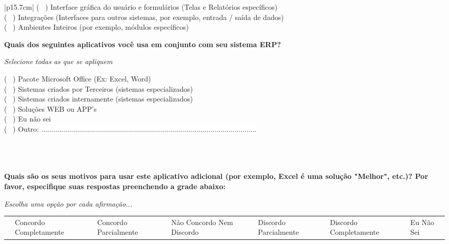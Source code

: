 \begin{longtable}{|p{15.7cm}|}
	( \ ) Interface gráfica do usuário e formulários (Telas e Relatórios específicos)\\
	( \ ) Integrações (Interfaces para outros sistemas, por exemplo, entrada / saída de dados)\\
	( \ ) Ambientes Inteiros (por exemplo, módulos específicos) \\
	\begin{Spacing}{0.8} \end{Spacing}
	\begin{Spacing}{0.8} 
		\textbf{Quais dos seguintes aplicativos você usa em conjunto com seu sistema ERP?} \end{Spacing} 
	\begin{Spacing}{2.0} 
		\tiny \textit{Selecione todas as que se apliquem} \end{Spacing} 
	( \ ) Pacote Microsoft Office (Ex: Excel, Word) \\
	( \ ) Sistemas criados por Terceiros (sistemas especializados) \\
	( \ ) Sistemas criados internamente (sistemas especializados) \\
	( \ ) Soluções WEB ou APP's \\
	( \ ) Eu não sei \\
	( \ ) Outro: \colorbox{white}{ ............................................................................................................ } \\
	\\
	\\
	\\
	\begin{Spacing}{0.8} \end{Spacing}
	\begin{Spacing}{0.8} 
		\textbf{Quais são os seus motivos para usar este aplicativo adicional (por exemplo, Excel é uma solução "Melhor", etc.)? Por favor, especifique suas respostas preenchendo a grade abaixo:} \end{Spacing} 
	\begin{Spacing}{2.0} 
		\tiny \textit{Escolha uma opção por cada afirmação...} \end{Spacing} 
	\begin{Spacing}{2.0} \end{Spacing}
	\tiny \begin{tabularx}{15.7 cm}{|X|X|X|X|X|X|X|}
		\hline
		& Concordo Completamente &	Concordo Parcialmente &	Não Concordo Nem Discordo &	Discordo  Parcialmente &	Discordo  Completamente &	Eu Não Sei\\

\end{tabularx}
\end{longtable}
